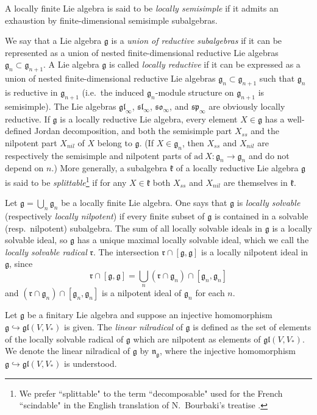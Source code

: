 \documentclass{article}
\def\gl{\mathfrak {gl}}
\def\g{\mathfrak {g}}
\def\n{\mathfrak {n}}
\def\sl{\mathfrak{sl}}
\def\so{\mathfrak{so}}
\def\sp{\mathfrak{sp}}
\def\k{\mathfrak{k}}
\def\r{\mathfrak{r}}
\newcommand {\ad}{\mathrm{ad \:}}
\begin{document}
A locally finite Lie algebra is said to be \emph{locally semisimple} if it admits an exhaustion by finite-dimensional semisimple subalgebras.  

We say that a Lie algebra $\g$ is a \emph{union of reductive subalgebras} if it can be represented as a union of nested finite-dimensional reductive Lie algebras $\g_n \subset \g_{n+1}$.  A Lie algebra $\g$ is called \emph{locally reductive} if it can be expressed as a union of nested finite-dimensional reductive Lie algebras $\g_n \subset \g_{n+1}$ such that $\g_n$ is reductive in $\g_{n+1}$ (i.e.\ the induced $\g_n$-module structure on $\g_{n+1}$ is semisimple). The Lie algebras $\gl_\infty$, $\sl_\infty$, $\so_\infty$, and $\sp_\infty$ are obviously locally reductive. If $\g$ is a locally reductive Lie algebra, every element $X\in\g$ has a well-defined Jordan decomposition, and both the semisimple part $X_{ss}$ and the nilpotent part $X_{nil}$ of $X$ belong to $\g$.  (If $X \in \g_n$, then $X_{ss}$ and $X_{nil}$ are respectively the semisimple and nilpotent parts of $\ad X \colon \g_n \rightarrow \g_n$ and do not depend on $n$.)  More generally, a subalgebra $\k$ of a locally reductive Lie algebra $\g$ is said to be \emph{splittable}\footnote{We prefer ``splittable" to the term ``decomposable" used for the French ``scindable" in the English translation of N.\ Bourbaki's treatise \cite{Bourbaki}.} if for any $X \in \k$ both $X_{ss}$ and $X_{nil}$ are themselves in $\k$. 

Let $\g = \bigcup_n \g_n$ be a locally finite Lie algebra.  One says that $\g$ is \emph{locally solvable} (respectively \emph{locally nilpotent}) if every finite subset of $\g$ is contained in a solvable (resp.\ nilpotent) subalgebra.  The sum of all locally solvable ideals in $\g$ is a locally solvable ideal, so $\g$ has a unique maximal locally solvable ideal, which we call the \emph{locally solvable radical} $\r$.  The intersection $\r \cap [\g,\g]$ is a locally nilpotent ideal in $\g$, since
$$\r \cap [\g,\g] = \bigcup_n (\r \cap \g_n) \cap [\g_n , \g_n]$$
and $(\r \cap \g_n) \cap [\g_n , \g_n]$ is a nilpotent ideal of $\g_n$ for each $n$.

Let $\g $ be a finitary Lie algebra and suppose an injective homomorphism $\g \hookrightarrow \gl(V,V_*)$ is given. The \emph{linear nilradical} of $\g$ is defined as the set of elements of the locally solvable radical of $\g$ which are nilpotent as elements of $\gl(V,V_*)$.  We denote the linear nilradical of $\g$ by $\n_\g$, where the injective homomorphism $\g \hookrightarrow \gl(V,V_*)$ is understood.  
\end{document}
